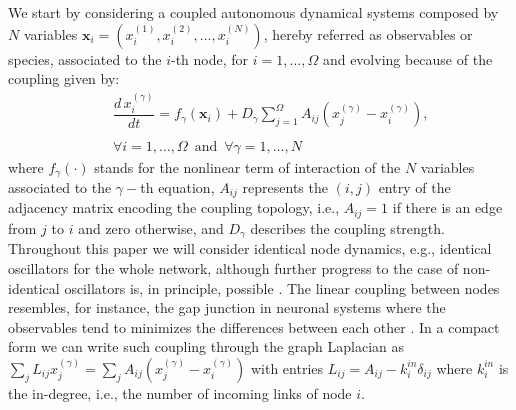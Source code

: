 \documentclass[prx,twocolumn,amsmath,noshowkeys,noshowpacs,amssymb]{revtex4-2}
\begin{document}
We start by considering a coupled autonomous dynamical systems composed by $N$ variables $\mathbf{x}_i=\left(x_i^{(1)}, x_i^{(2)},\dots,x_i^{(N)}\right)$, hereby referred as observables or species, associated to the $i$-th node, for $i=1,\dots,\Omega$ and evolving because of the coupling given by:
\begin{eqnarray}
&&\dfrac{d\, x_i^{(\gamma)}}{dt}= f_{\gamma}(\mathbf{x}_i) + D_{\gamma}\sum_{j=1}^\Omega A_{ij} \left(x_j^{(\gamma)} - x_i^{(\gamma)}\right),\\\nonumber\\ &&\forall i=1,\dots,\Omega\,\,\, \mathrm{and}\,\,\, \forall \gamma=1,\dots, N\nonumber \label{eq:gen}
\end{eqnarray}
where $f_{\gamma}(\cdot)$ stands for the nonlinear term of interaction of the $N$ variables associated to the $\gamma-$th equation, $A_{ij}$ represents the $(i,j)$ entry of the adjacency matrix encoding the coupling topology, i.e., $A_{ij}=1$ if there is an edge from $j$ to $i$ and zero otherwise, and $D_{\gamma}$ describes the coupling strength. Throughout this paper we will consider identical node dynamics, e.g., identical oscillators for the whole network, although further progress to the case of non-identical oscillators is, in principle, possible \cite{Sun_2009, Zhang_2018}. {The linear coupling between nodes resembles, for instance, the gap junction in neuronal systems where the observables tend to minimizes the differences between each other \cite{varshney_structural_2011, sorrentino_synchronization_2012}.} In a compact form we can write such coupling through the graph Laplacian as $\sum_j L_{ij}x_j^{(\gamma)} = \sum_j A_{ij}\left(x_j^{(\gamma)}-x_i^{(\gamma)}\right)$ with entries $L_{ij}=A_{ij}-k_i^{in}\delta_{ij}$ where $k_i^{in}$ is the in-degree, i.e., the number of incoming links of node $i$.
\end{document}
